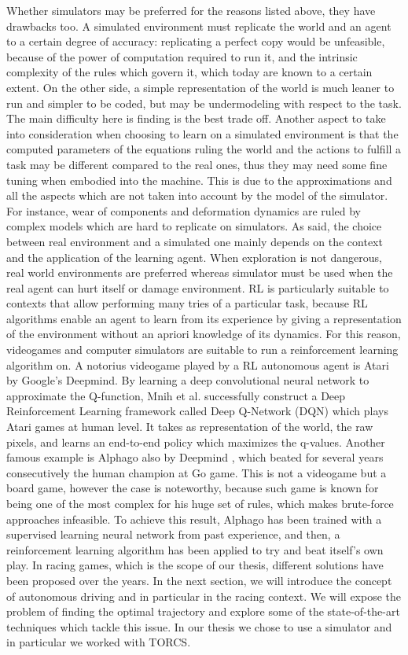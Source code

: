 Whether simulators may be preferred for the reasons listed above, they have drawbacks too. A simulated environment must replicate the world and an agent to a certain degree of accuracy: replicating a perfect copy would be unfeasible, because of the power of computation required to run it, and the intrinsic complexity of the rules which govern it, which today are known to a certain extent. On the other side, a simple representation of the world is much leaner to run and simpler to be coded, but may be undermodeling with respect to the task. The main difficulty here is finding is the best trade off.
Another aspect to take into consideration when choosing to learn on a simulated environment is that the computed parameters of the equations ruling the world and the actions to fulfill a task may be different compared to the real ones, thus they may need some fine tuning when embodied into the machine. This is due to the approximations and all the aspects which are not taken into account by the model of the simulator. For instance, wear of components and deformation dynamics are ruled by complex models which are hard to replicate on simulators.
As said, the choice between real environment and a simulated one mainly depends on the context and the application of the learning agent. When exploration is not dangerous, real world environments are preferred whereas simulator must be used when the real agent can hurt itself or damage environment.
RL is particularly suitable to contexts that allow performing many tries of a particular task, because RL algorithms enable an agent to learn from its experience by giving a representation of the environment without an apriori knowledge of its dynamics. For this reason, videogames and computer simulators are suitable to run a reinforcement learning algorithm on.
A notorius videogame played by a RL autonomous agent is Atari \cite{atari} by Google's Deepmind. By learning a deep convolutional neural network to approximate the Q-function, Mnih et al. successfully construct a Deep Reinforcement Learning framework called Deep Q-Network (DQN) which plays Atari games at human level. It takes as representation of the world, the raw pixels, and learns an end-to-end policy which maximizes the q-values.
Another famous example is Alphago also by Deepmind \cite{alphago}, which beated for several years consecutively the human champion at Go game. This is not a videogame but a board game, however the case is noteworthy, because such game is known for being one of the most complex  for his huge set of rules, which makes brute-force approaches infeasible. To achieve this result, Alphago has been trained with a supervised learning neural network from past experience, and then, a reinforcement learning algorithm has been applied to try and beat itself's own play. 
In racing games, which is the scope of our thesis, different solutions have been proposed over the years. In the next section, we will introduce the concept of autonomous driving and in particular in the racing context. We will expose the problem of finding the optimal trajectory and explore some of the state-of-the-art techniques which tackle this issue.
In our thesis we chose to use a simulator and in particular we worked with TORCS.

